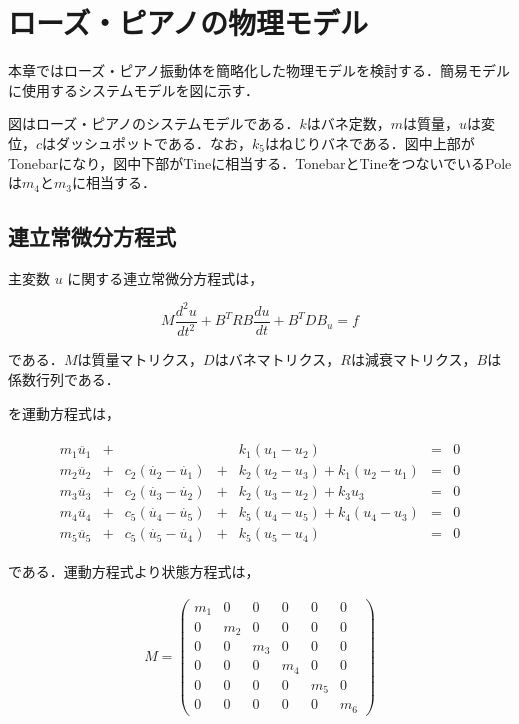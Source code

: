 \section{ローズ・ピアノの物理モデル}

本章ではローズ・ピアノ振動体を簡略化した物理モデルを検討する．簡易モデルに使用するシステムモデルを図に示す．


図はローズ・ピアノのシステムモデルである．$k$はバネ定数，$m$は質量，$u$は変位，$c$はダッシュポットである．なお，$k_5$はねじりバネである．図中上部がTonebarになり，図中下部がTineに相当する．TonebarとTineをつないでいるPoleは$m_4$と$m_3$に相当する．

\subsection{連立常微分方程式}

主変数 $u$ に関する連立常微分方程式は，

\begin{equation}
    M \frac{d^2 u}{dt^2} + B^T R B \frac{du}{dt} + B^T D B_u = f    
\end{equation}

である．$M$は質量マトリクス，$D$はバネマトリクス，$R$は減衰マトリクス，$B$は係数行列である．

を運動方程式は，

\begin{eqnarray}
    \begin{matrix}
        m_1 \ddot{u_1} &+&  & & k_1 (u_1 - u_2) &=& 0 \\ 
        m_2 \ddot{u_2} &+& c_2(\dot{u_2} - \dot{u_1}) &+& k_2 (u_2 - u_3) + k_1 (u_2 - u_1) &=& 0 \\ 
        m_3 \ddot{u_3} &+& c_2(\dot{u_3} - \dot{u_2}) &+& k_2 (u_3 - u_2) + k_3 u_3 &=& 0 \\ 
        m_4 \ddot{u_4} &+& c_5(\dot{u_4} - \dot{u_5}) &+& k_5 (u_4 - u_5) + k_4 (u_4 - u_3) &=& 0 \\ 
        m_5 \ddot{u_5} &+& c_5(\dot{u_5} - \dot{u_4}) &+& k_5 (u_5 - u_4) &=& 0
    \end{matrix}        
\end{eqnarray}

である．運動方程式より状態方程式は，

\begin{eqnarray}
    M = 
    \left(\begin{matrix}
        m_1 & 0   & 0   & 0   & 0   & 0   \\
        0   & m_2 & 0   & 0   & 0   & 0   \\
        0   & 0   & m_3 & 0   & 0   & 0   \\
        0   & 0   & 0   & m_4 & 0   & 0   \\
        0   & 0   & 0   & 0   & m_5 & 0   \\
        0   & 0   & 0   & 0   & 0   & m_6
    \end{matrix}\right)
\end{eqnarray}

